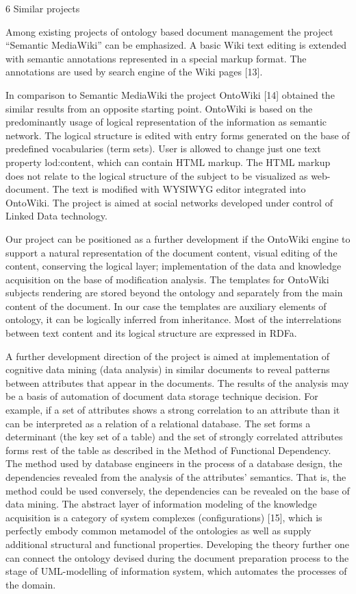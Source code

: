 \documentclass[conference]{IEEEtran}
\begin{document}
 6  Similar projects

Among existing projects of ontology based document management the project “Semantic MediaWiki” can be emphasized. A basic Wiki text editing is extended with semantic annotations represented in a special markup format. The annotations are used by search engine of the Wiki pages [13].

In comparison to Semantic MediaWiki the project OntoWiki [14] obtained the similar results from an opposite starting point. OntoWiki is based on the predominantly usage of logical representation of the information as semantic network. The logical structure is edited with entry forms generated on the base of predefined vocabularies (term sets). User is allowed to change just one text property lod:content, which can contain HTML markup. The HTML markup does not relate to the logical structure of the subject to be visualized as web-document. The text is modified with WYSIWYG editor integrated into OntoWiki. The project is aimed at social networks developed under control of Linked Data technology.

Our project can be positioned as a further development if the OntoWiki engine to support a natural representation of the document content, visual editing of the content, conserving the logical layer; implementation of the data and knowledge acquisition on the base of modification analysis. The templates for OntoWiki subjects rendering are stored beyond the ontology and separately from the main content of the document. In our case the templates are auxiliary elements of ontology, it can be logically inferred from inheritance. Most of the interrelations between text content and its logical structure are expressed in RDFa.

A further development direction of the project is aimed at implementation of cognitive data mining (data analysis) in similar documents to reveal patterns between attributes that appear in the documents. The results of the analysis may be a basis of automation of document data storage technique decision. For example, if a set of attributes shows a strong correlation to an attribute than it can be interpreted as a relation of a relational database. The set forms a determinant (the key set of a table) and the set of strongly correlated attributes forms rest of the table as described in the Method of Functional Dependency. The method used by database engineers in the process of a database design, the dependencies revealed from the analysis of the attributes’ semantics. That is, the method could be used conversely, the dependencies can be revealed on the base of data mining.
The abstract layer of information modeling of the knowledge acquisition is a category of system complexes (configurations) [15], which is perfectly embody common metamodel of the ontologies as well as supply additional structural and functional properties. Developing the theory further one can connect the ontology devised during the document preparation process to the stage of UML-modelling of information system, which automates the processes of the domain.
\end{document}

